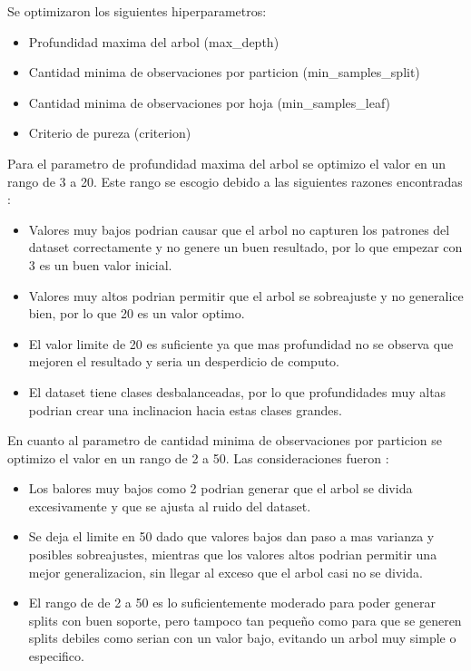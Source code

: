 \documentclass[12pt,a4paper]{article}
\begin{document}
Se optimizaron los siguientes hiperparametros:

\begin{itemize}
  \item Profundidad maxima del arbol (max\_depth)
  \item Cantidad minima de observaciones por particion (min\_samples\_split)
  \item Cantidad minima de observaciones por hoja (min\_samples\_leaf)
  \item Criterio de pureza (criterion)
\end{itemize}

Para el parametro de profundidad maxima del arbol se optimizo el valor en un rango de 3 a 20. Este rango se escogio debido
a las siguientes razones encontradas \autocite{sklearnerConfigureDecisionTreeClassifierMax_depth,scikitlearnDecisionTrees,christinaellisMaxDepthRandom2022}:
\begin{itemize}
  \item Valores muy bajos podrian causar que el arbol no capturen los patrones del dataset correctamente y no genere un buen resultado,
    por lo que empezar con 3 es un buen valor inicial.
  \item Valores muy altos podrian permitir que el arbol se sobreajuste y no generalice bien, por lo que 20 es un valor optimo.
  \item El valor limite de 20 es suficiente ya que mas profundidad no se observa que mejoren el resultado y seria un desperdicio de computo.
  \item El dataset tiene clases desbalanceadas, por lo que profundidades muy altas podrian crear una inclinacion hacia estas clases grandes.
\end{itemize}

En cuanto al parametro de cantidad minima de observaciones por particion se optimizo el valor en un rango de 2 a 50.
Las consideraciones fueron \autocite{mDecisionTreesSplit2024,gibbinsVisualGuideTuning2025}:
\begin{itemize}
  \item Los balores muy bajos como 2 podrian generar que el arbol se divida excesivamente y que se ajusta al ruido del dataset.
  \item Se deja el limite en 50 dado que valores bajos dan paso a mas varianza y posibles sobreajustes,
    mientras que los valores altos podrian permitir una mejor generalizacion, sin llegar al exceso
    que el arbol casi no se divida.
  \item El rango de de 2 a 50 es lo suficientemente moderado para poder generar splits con buen soporte,
    pero tampoco tan pequeño como para que se generen splits debiles como serian con un valor bajo, evitando un arbol muy simple o especifico.
\end{itemize}
\end{document}
